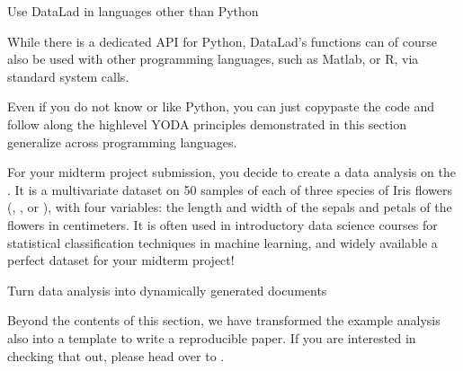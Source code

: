 \ignorespaces \begin{importantnote}[label={index-2}, before title={\thetcbcounter\ }, check odd page=true]{Use DataLad in languages other than Python}
\label{\detokenize{basics/101-130-yodaproject:index-2}}

\sphinxAtStartPar
While there is a dedicated API for Python, DataLad’s functions can of course
also be used with other programming languages, such as Matlab, or R, via standard
system calls.

\sphinxAtStartPar
Even if you do not know or like Python, you can just copy\sphinxhyphen{}paste the code
and follow along \textendash{} the high\sphinxhyphen{}level YODA principles demonstrated in this
section generalize across programming languages.


\end{importantnote}

\sphinxAtStartPar
For your midterm project submission, you decide to create a data analysis on the
.
It is a multivariate dataset on 50 samples of each of three species of Iris
flowers (, , or ), with four variables: the length and width of the sepals and petals
of the flowers in centimeters. It is often used in introductory data science
courses for statistical classification techniques in machine learning, and
widely available \textendash{} a perfect dataset for your midterm project!

\ignorespaces \begin{importantnote}[label={index-3}, before title={\thetcbcounter\ }, check odd page=true]{Turn data analysis into dynamically generated documents}
\label{\detokenize{basics/101-130-yodaproject:index-3}}

\sphinxAtStartPar
Beyond the contents of this section, we have transformed the example analysis also into a template to write a reproducible paper.
If you are interested in checking that out, please head over to .


\end{importantnote}


